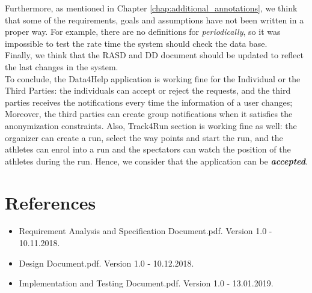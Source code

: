 \documentclass[a4paper, hidelinks, 12pt]{report}
\begin{document}
	Furthermore, as mentioned in Chapter \ref{chap:additional_annotations}, we think that some of the requirements, goals and assumptions have not been written in a proper way. For example, there are no definitions for \textit{periodically}, so it was impossible to test the rate time the system should check the data base. \\
	
	Finally, we think that the RASD and DD document should be updated to reflect the last changes in the system.\\
	
	To conclude, the Data4Help application is working fine for the Individual or the Third Parties: the individuals can accept or reject the requests, and the third parties receives the notifications every time the information of a user changes; Moreover, the third parties can create group notifications when it satisfies the anonymization constraints. Also, Track4Run section is working fine as well: the organizer can create a run, select the way points and start the run, and the athletes can enrol into a run and the spectators can watch the position of the athletes during the run. Hence, we consider that the application can be \textbf{\emph{accepted}}.

	\chapter{References}
	\begin{itemize}
		\item Requirement Analysis and Specification Document.pdf. Version 1.0 - 10.11.2018.
		\item Design Document.pdf. Version 1.0 - 10.12.2018.
		\item Implementation and Testing Document.pdf. Version 1.0 - 13.01.2019.
	\end{itemize}
\end{document}
